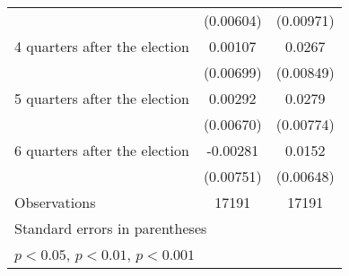 \begin{table}[htbp]
\begin{tabular}{l*{2}{c}}
                    &   (0.00604)         &   (0.00971)         \\
[1em]
 4 quarters after the election&     0.00107         &      0.0267\sym{**} \\
                    &   (0.00699)         &   (0.00849)         \\
[1em]
 5 quarters after the election&     0.00292         &      0.0279\sym{***}\\
                    &   (0.00670)         &   (0.00774)         \\
[1em]
 6 quarters after the election&    -0.00281         &      0.0152\sym{*}  \\
                    &   (0.00751)         &   (0.00648)         \\
\hline
Observations        &       17191         &       17191         \\
\hline\hline
\multicolumn{3}{l}{\footnotesize Standard errors in parentheses}\\
\multicolumn{3}{l}{\footnotesize \sym{*} \(p<0.05\), \sym{**} \(p<0.01\), \sym{***} \(p<0.001\)}\\
\end{tabular}
\end{table}
